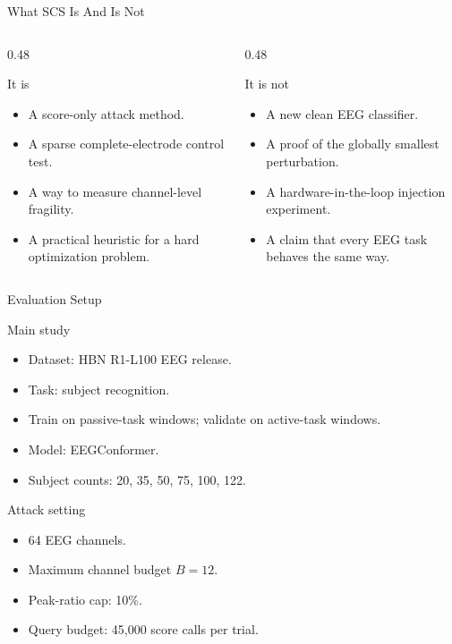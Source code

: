 \documentclass[aspectratio=169,11pt]{beamer}
\begin{document}
\begin{frame}{What SCS Is And Is Not}
\begin{columns}[T,onlytextwidth]
  \begin{column}{0.48\textwidth}
    \begin{block}{It is}
      \begin{itemize}
        \item A score-only attack method.
        \item A sparse complete-electrode control test.
        \item A way to measure channel-level fragility.
        \item A practical heuristic for a hard optimization problem.
      \end{itemize}
    \end{block}
  \end{column}
  \begin{column}{0.48\textwidth}
    \begin{block}{It is not}
      \begin{itemize}
        \item A new clean EEG classifier.
        \item A proof of the globally smallest perturbation.
        \item A hardware-in-the-loop injection experiment.
        \item A claim that every EEG task behaves the same way.
      \end{itemize}
    \end{block}
  \end{column}
\end{columns}
\end{frame}

\begin{frame}{Evaluation Setup}
\begin{block}{Main study}
\begin{itemize}
  \item Dataset: HBN R1-L100 EEG release.
  \item Task: subject recognition.
  \item Train on passive-task windows; validate on active-task windows.
  \item Model: EEGConformer.
  \item Subject counts: 20, 35, 50, 75, 100, 122.
\end{itemize}
\end{block}

\begin{block}{Attack setting}
\begin{itemize}
  \item 64 EEG channels.
  \item Maximum channel budget \(B=12\).
  \item Peak-ratio cap: 10\%.
  \item Query budget: 45,000 score calls per trial.
\end{itemize}
\end{block}
\end{frame}
\end{document}

